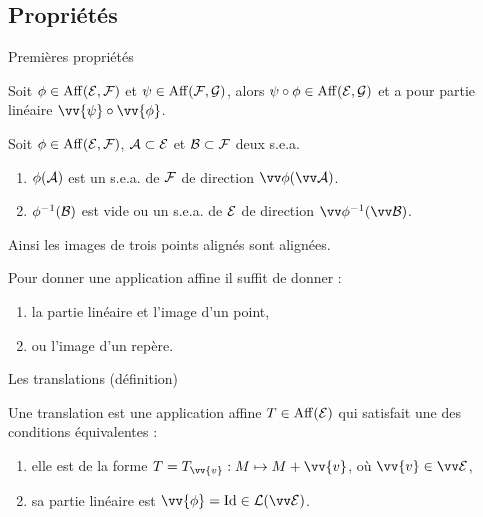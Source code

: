 \documentclass{m53beamer}
\begin{document}
\subsection{Propriétés}
  \begin{frame}{Premières propriétés}
    \begin{proposition}
      Soit $\phi\in\operatorname{Aff}(\mathcal{E},\mathcal{F})$ et $\psi\in\operatorname{Aff}(\mathcal{F},\mathcal{G})$, alors $\psi\circ\phi\in\operatorname{Aff}(\mathcal{E},\mathcal{G})$ et a pour partie linéaire $\vv{\psi}\circ\vv{\phi}$.
    \end{proposition}\pause
    \begin{proposition}
      Soit $\phi\in\operatorname{Aff}(\mathcal{E},\mathcal{F})$, $\mathcal{A} \subset \mathcal{E}$ et $\mathcal{B} \subset \mathcal{F}$ deux s.e.a.
      \begin{enumerate}
        \item $\phi(\mathcal{A})$ est un s.e.a. de $\mathcal{F}$ de direction $\vv\phi(\ev{A})$.
        \item $\phi^{-1}(\mathcal{B})$ est vide ou un s.e.a. de $\mathcal{E}$ de direction $\vv\phi^{-1}(\ev{B})$.
      \end{enumerate}
      Ainsi les images de trois points alignés sont alignées.
    \end{proposition}\pause
    \begin{proposition}
      Pour donner une application affine il suffit de donner :
      \begin{enumerate}[<+(1)->]
        \item la partie linéaire et l'image d'un point,
        \item ou l'image d'un repère.
      \end{enumerate}
    \end{proposition}
  \end{frame}
  \begin{frame}{Les translations (définition)}
    \begin{defprop}
      Une \alert{translation} est  une application affine $T \in \operatorname{Aff}(\mathcal{E})$ qui satisfait une des conditions équivalentes :
      \begin{enumerate}[<+(1)->]
        \item elle est de la forme $T=T_{\vv{v}}:M \mapsto M+\vv{v}$, où $\vv{v} \in \ev{E}$,
        \item sa partie linéaire est $\vv{\phi}=\id \in \lin(\ev{E})$.
      \end{enumerate}
    \end{defprop}
  \end{frame}
\end{document}
